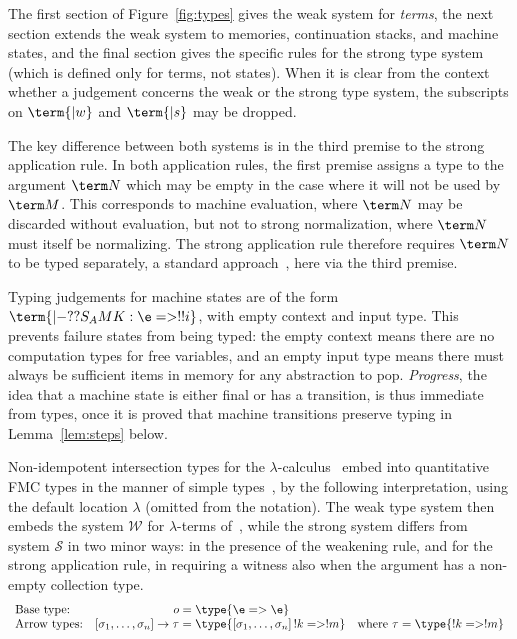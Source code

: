 \documentclass[10pt,a4paper]{amsart}
\begin{document}
The first section of Figure~\ref{fig:types} gives the weak system for \emph{terms}, the next section extends the weak system to memories, continuation stacks, and machine states, and the final section gives the specific rules for the strong type system (which is defined only for terms, not states). When it is clear from the context whether a judgement concerns the weak or the strong type system, the subscripts on $\term{|w}$ and $\term{|s}$ may be dropped.

The key difference between both systems is in the third premise to the strong application rule. In both application rules, the first premise assigns a type to the argument $\term N$ which may be empty in the case where it will not be used by $\term M$. This corresponds to machine evaluation, where $\term N$ may be discarded without evaluation, but not to strong normalization, where $\term N$ must itself be normalizing. The strong application rule therefore requires $\term N$ to be typed separately, a standard approach~\cite{Bono-Dezani-2020,Bucciarelli-Kesner-Ventura-2017}, here via the third premise.

Typing judgements for machine states are of the form $\term{|- ??{S_A}MK : \e=>!!i}$, with empty context and input type. This prevents failure states from being typed: the empty context means there are no computation types for free variables, and an empty input type means there must always be sufficient items in memory for any abstraction to pop. \emph{Progress}, the idea that a machine state is either final or has a transition, is thus immediate from types, once it is proved that machine transitions preserve typing in Lemma~\ref{lem:steps} below.

Non-idempotent intersection types for the $\lambda$-calculus~\cite{Bucciarelli-Kesner-Ventura-2017} embed into quantitative FMC types in the manner of simple types~\cite{Heijltjes-2022}, by the following interpretation, using the default location $\lambda$ (omitted from the notation). The weak type system then embeds the system $\mathcal W$ for $\lambda$-terms of~\cite{Bucciarelli-Kesner-Ventura-2017}, while the strong system differs from system $\mathcal S$ in two minor ways: in the presence of the weakening rule, and for the strong application rule, in requiring a witness also when the argument has a non-empty collection type.
\[
\begin{array}{lr@{}l}
	\text{Base type:}      &                                  o &{}= \type{\e=>\e}
\\	\text{Arrow types:}    & [\sigma_1,\dots,\sigma_n] \to \tau &{}= \type{[\sigma_1,\dots,\sigma_n]\,!k => !m} \quad\text{where}~\tau=\type{!k => !m}
\end{array}
\]
\end{document}
